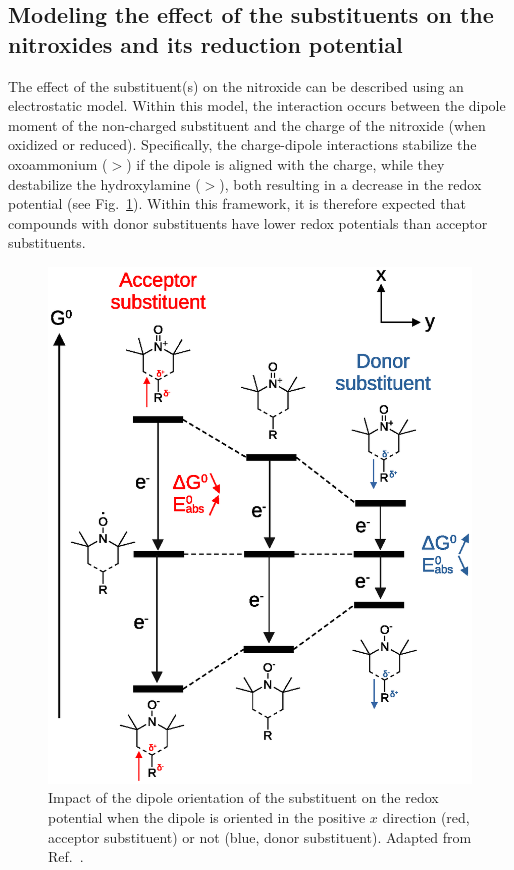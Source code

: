 \documentclass[review,preprint]{elsarticle}
\begin{document}
\subsection{Modeling the effect of the substituents on the nitroxides and its reduction potential}\label{sec:eleczhang}

The effect of the substituent(s) on the nitroxide can be described using an electrostatic model. Within this model, the interaction occurs between the dipole moment of the non-charged substituent and the charge of the nitroxide (when oxidized or reduced).  Specifically, the charge-dipole interactions stabilize the oxoammonium ($>$) if the dipole is aligned with the charge, while they destabilize the hydroxylamine ($>$), both resulting in a decrease in the redox potential (see Fig.~\ref{fig:dipole}). Within this framework, it is therefore expected that compounds with donor substituents have lower redox potentials than acceptor substituents.


\begin{figure}[!h]
	\centering
	\includegraphics[width=.8\linewidth]{Figure4}
	\caption{Impact of the dipole orientation of the  substituent on the redox potential when the dipole is oriented in  the positive $x$ direction (red, acceptor substituent) or not (blue, donor substituent). Adapted from Ref.~.}
	\label{fig:dipole}
\end{figure}
\end{document}
